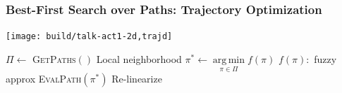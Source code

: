 \documentclass[serif]{beamer}
\DeclareMathOperator*{\argmin}{arg\,min}
\begin{document}
\begin{frame}
   \frametitle{Best-First Search over Paths: Trajectory Optimization}
   \begin{center}
      \texttt{[image: build/talk-act1-2d,trajd]}
      
      \begin{minipage}{0.8\textwidth}
      \begin{algorithmic}
      \Loop
         \State $\Pi \leftarrow $ \textsc{GetPaths}$()$
            \Comment Local neighborhood
         \State $\pi^* \leftarrow \argmin\limits_{\pi \in \Pi} f(\pi)$
            \Comment $f(\pi):$ fuzzy approx
         \State \textsc{EvalPath}$(\pi^*)$
            \Comment Re-linearize
      \EndLoop
      \end{algorithmic}
      \end{minipage}
   \end{center}
\end{frame}
\end{document}
